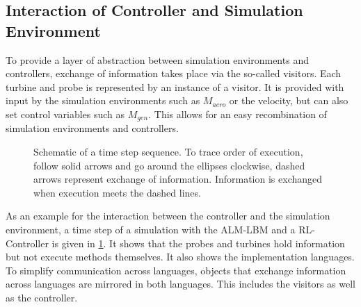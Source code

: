 \subsection{Interaction of Controller and Simulation Environment}
To provide a layer of abstraction between simulation environments and controllers, exchange of information takes place via the so-called visitors. Each turbine and probe is represented by an instance of a visitor. It is provided with input by the simulation environments such as $M_{aero}$ or the velocity, but can also set control variables such as $M_{gen}$. This allows for an easy recombination of simulation environments and controllers. \\
\begin{figure}[h]
	\centering
	\def\svgwidth{1 \textwidth}
	
	\caption{Schematic of a time step sequence. To trace order of execution, follow solid arrows and go around the ellipses clockwise, dashed arrows represent exchange of information. Information is exchanged when execution meets the dashed lines.}
	\label{fig:time_step}
\end{figure}
As an example for the interaction between the controller and the simulation environment, a time step of a simulation with the ALM-LBM and a RL-Controller is given in \ref{fig:time_step}. It shows that the probes and turbines hold information but not execute methods themselves. It also shows the implementation languages. To simplify communication across languages, objects that exchange information across languages are mirrored in both languages. This includes the visitors as well as the controller.
